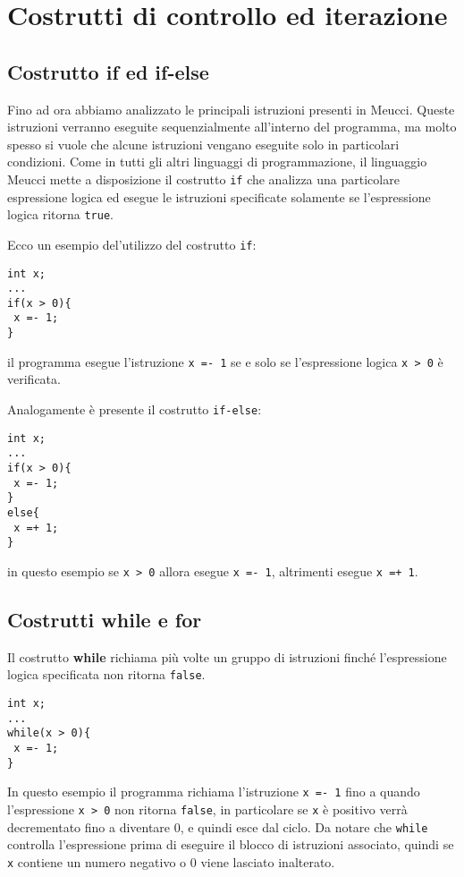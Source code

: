 \documentclass[10pt]{book}%
\newcommand{\e}{\`{e} }
\newcommand{\ac}[1]{\`{#1}}
\newcommand{\code}[1]{\texttt{#1}}
\renewcommand{\emph}[1]{\textbf{#1}}
\newenvironment{codeenv}{
\begin{mdframed}[backgroundcolor=black!20,topline=false,leftline=false,rightline=false,bottomline=false]
}
{\end{mdframed}}
\begin{document}
\section{Costrutti di controllo ed iterazione}
\subsection{Costrutto if ed if-else}
Fino ad ora abbiamo analizzato le principali istruzioni presenti in Meucci. Queste istruzioni verranno eseguite sequenzialmente all'interno del programma, ma molto spesso si vuole che alcune istruzioni vengano eseguite solo in particolari condizioni. Come in tutti gli altri linguaggi di programmazione, il linguaggio Meucci mette a disposizione il costrutto \code{if} che analizza una particolare espressione logica ed esegue le istruzioni specificate solamente  se l'espressione logica ritorna \code{true}.

Ecco un esempio del'utilizzo del costrutto \code{if}:

\begin{codeenv}
\begin{verbatim}
int x;
...
if(x > 0){
 x =- 1;
}
\end{verbatim}
\end{codeenv}

il programma esegue l'istruzione \code{x =- 1} se e solo se l'espressione logica \code{x > 0} \e verificata.

Analogamente \e presente il costrutto \code{if-else}:
\begin{codeenv}
\begin{verbatim}
int x;
...
if(x > 0){
 x =- 1;
}
else{
 x =+ 1;
}
\end{verbatim}
\end{codeenv}
in questo esempio se \code{x > 0} allora esegue \code{x =- 1}, altrimenti esegue \code{x =+ 1}.

\subsection{Costrutti while e for}
Il costrutto \emph{while} richiama pi\ac u volte un gruppo di istruzioni finch\'e l'espressione logica specificata non ritorna \code{false}.
\begin{codeenv}
\begin{verbatim}
int x;
...
while(x > 0){
 x =- 1;
}
\end{verbatim}
\end{codeenv}
In questo esempio il programma richiama l'istruzione \code{x =- 1} fino a quando l'espressione \code{x > 0} non ritorna \code{false}, in particolare se \code x \e positivo verr\ac a decrementato fino a diventare 0, e quindi esce dal ciclo. Da notare che \code{while} controlla l'espressione prima di eseguire il blocco di istruzioni associato, quindi se \code x contiene un numero negativo o 0 viene lasciato inalterato.
\end{document}
